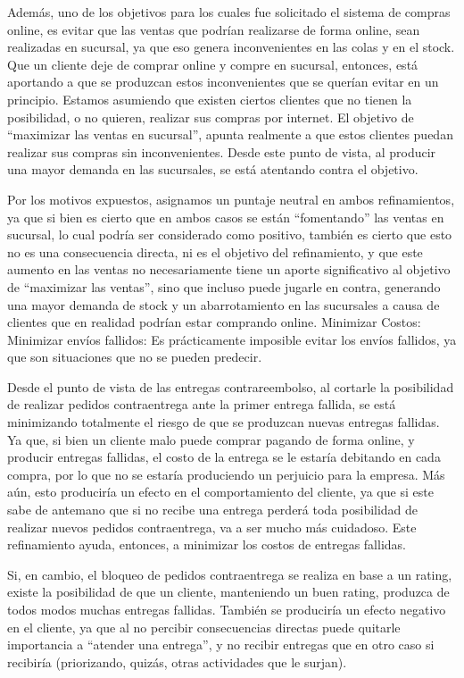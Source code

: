 Además, uno de los objetivos para los cuales fue solicitado el sistema de
compras online, es evitar que las ventas que podrían realizarse de forma
online, sean realizadas en sucursal, ya que eso genera inconvenientes en las
colas y en el stock. Que un cliente deje de comprar online y compre en
sucursal, entonces, está aportando a que se produzcan estos inconvenientes que
se querían evitar en un principio. Estamos asumiendo que existen ciertos
clientes que no tienen la posibilidad, o no quieren, realizar sus compras por
internet. El objetivo de ``maximizar las ventas en sucursal'', apunta
realmente a que estos clientes puedan realizar sus compras sin inconvenientes.
Desde este punto de vista, al producir una mayor demanda en las sucursales, se
está atentando contra el objetivo.

Por los motivos expuestos, asignamos un puntaje neutral en ambos
refinamientos, ya que si bien es cierto que en ambos casos se están
``fomentando'' las ventas en sucursal, lo cual podría ser considerado como
positivo, también es cierto que esto no es una consecuencia directa, ni es el
objetivo del refinamiento, y que este aumento en las ventas no necesariamente
tiene un aporte significativo al objetivo de ``maximizar las ventas'', sino
que incluso puede jugarle en contra, generando una mayor demanda de stock y un
abarrotamiento en las sucursales a causa de clientes que en realidad podrían
estar comprando online. Minimizar Costos: Minimizar envíos fallidos: Es
prácticamente imposible evitar los envíos fallidos, ya que son situaciones que
no se pueden predecir.

Desde el punto de vista de las entregas contrareembolso, al cortarle la
posibilidad de realizar pedidos contraentrega ante la primer entrega fallida,
se está minimizando totalmente el riesgo de que se produzcan nuevas entregas
fallidas. Ya que, si bien un cliente malo puede comprar pagando de forma
online, y producir entregas fallidas, el costo de la entrega se le estaría
debitando en cada compra, por lo que no se estaría produciendo un perjuicio
para la empresa. Más aún, esto produciría un efecto en el comportamiento del
cliente, ya que si este sabe de antemano que si no recibe una entrega perderá
toda posibilidad de realizar nuevos pedidos contraentrega, va a ser mucho más
cuidadoso. Este refinamiento ayuda, entonces, a minimizar los costos de
entregas fallidas.

Si, en cambio, el bloqueo de pedidos contraentrega se realiza en base a un
rating, existe la posibilidad de que un cliente, manteniendo un buen rating,
produzca de todos modos muchas entregas fallidas. También se produciría un
efecto negativo en el cliente, ya que al no percibir consecuencias directas
puede quitarle importancia a ``atender una entrega'', y no recibir entregas
que en otro caso si recibiría (priorizando, quizás, otras actividades que le
surjan).


